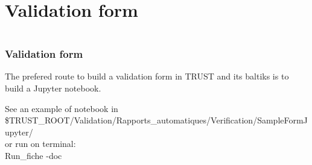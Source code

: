 \documentclass[10pt, hyperref={unicode=true,pdfusetitle, bookmarks=true,bookmarksnumbered=false,bookmarksopen=false, breaklinks=false,pdfborder={0 0l 1},backref=true,colorlinks=true,linkcolor=darkblue,pageanchor}]{beamer}
\begin{document}
\section{{\bf{Validation form}}}\label{exo_validation}
\begin{frame}
\begin{small}
\begin{columns}[c] 
\tableofcontents[sections={1-8},currentsection, currentsubsection]
\tableofcontents[sections={9-16},currentsection, currentsubsection]
\end{columns}
\end{small}
\end{frame}
\begin{frame}
\frametitle{Validation form}
\begin{block}{}

The prefered route to build a validation form in TRUST and its baltiks is to build a Jupyter notebook. \\
\vspace{0.5cm}

See an example of notebook in \\
\small{\$TRUST\_ROOT/Validation/Rapports\_automatiques/Verification/SampleFormJupyter/} \\
or run on terminal:\\
Run\_fiche -doc
\end{block}
\end{frame}
\end{document}
